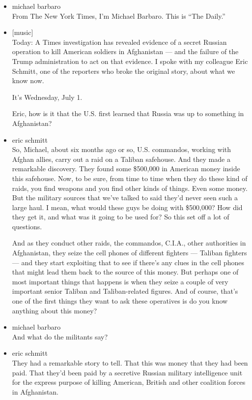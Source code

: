\begin{itemize}
\item
  michael barbaro\\
  From The New York Times, I'm Michael Barbaro. This is ``The Daily.''
\item
  {[}music{]}\\
  Today: A Times investigation has revealed evidence of a secret Russian
  operation to kill American soldiers in Afghanistan --- and the failure
  of the Trump administration to act on that evidence. I spoke with my
  colleague Eric Schmitt, one of the reporters who broke the original
  story, about what we know now.

  It's Wednesday, July 1.

  Eric, how is it that the U.S. first learned that Russia was up to
  something in Afghanistan?
\item
  eric schmitt\\
  So, Michael, about six months ago or so, U.S. commandos, working with
  Afghan allies, carry out a raid on a Taliban safehouse. And they made
  a remarkable discovery. They found some \$500,000 in American money
  inside this safehouse. Now, to be sure, from time to time when they do
  these kind of raids, you find weapons and you find other kinds of
  things. Even some money. But the military sources that we've talked to
  said they'd never seen such a large haul. I mean, what would these
  guys be doing with \$500,000? How did they get it, and what was it
  going to be used for? So this set off a lot of questions.

  And as they conduct other raids, the commandos, C.I.A., other
  authorities in Afghanistan, they seize the cell phones of different
  fighters --- Taliban fighters --- and they start exploiting that to
  see if there's any clues in the cell phones that might lead them back
  to the source of this money. But perhaps one of most important things
  that happens is when they seize a couple of very important senior
  Taliban and Taliban-related figures. And of course, that's one of the
  first things they want to ask these operatives is do you know anything
  about this money?
\item
  michael barbaro\\
  And what do the militants say?
\item
  eric schmitt\\
  They had a remarkable story to tell. That this was money that they had
  been paid. That they'd been paid by a secretive Russian military
  intelligence unit for the express purpose of killing American, British
  and other coalition forces in Afghanistan.


\end{itemize}
